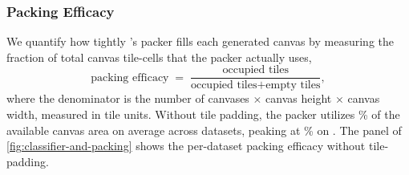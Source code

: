 
\subsubsection{Packing Efficacy}
\label{sec:ablation-packing}
We quantify how tightly \sys{}'s packer fills each generated canvas by measuring the
fraction of total canvas tile-cells that the packer actually uses,
\[
\text{packing efficacy} \;=\; \frac{\text{occupied tiles}}{\text{occupied tiles} + \text{empty tiles}},
\]
where the denominator is
the number of canvases $\times$ canvas height $\times$ canvas width,
measured in tile units.
Without tile padding, the packer utilizes
\packingEfficacyMeanAcrossDatasets{}\% of the available canvas area on average across
\packingEfficacyDatasetCount{} datasets,
peaking at \packingEfficacyBestValue{}\% on \packingEfficacyBestDatasetDisplay{}.
The  panel of \autoref{fig:classifier-and-packing} shows the per-dataset packing
efficacy without tile-padding.

